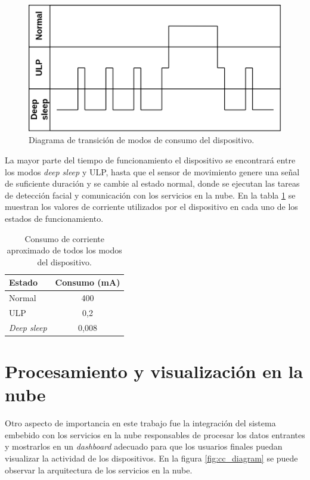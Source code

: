 \begin{figure}[h]
	\centering
	\includegraphics[scale=0.3]{./Figures/ulp_modes.png}
	\caption{Diagrama de transición de modos de consumo del dispositivo.}
	\label{fig:ulp_modes}
\end{figure}

La mayor parte del tiempo de funcionamiento el dispositivo se encontrará entre los modos \textit{deep sleep} y ULP, hasta que el sensor de movimiento genere una señal de suficiente duración y se cambie al estado normal, donde se ejecutan las tareas de detección facial y comunicación con los servicios en la nube. En la tabla \ref{tab:ulp_table} se muestran los valores de corriente utilizados por el dispositivo en cada uno de los estados de funcionamiento.

\begin{table}[h]
	\centering
	\caption[Consumo de corriente del dispositivo]{Consumo de corriente aproximado de todos los modos del dispositivo.}
	\begin{tabular}{lc}   
		\toprule
		\textbf{Estado} & \textbf{Consumo (mA)}  \\
		\midrule
		Normal & 400 \\
		ULP & 0,2 \\
		\textit{Deep sleep} & 0,008 \\
		\bottomrule
		\hline
	\end{tabular}
	\label{tab:ulp_table}
\end{table}

\section{Procesamiento y visualización en la nube}
Otro aspecto de importancia en este trabajo fue la integración del sistema embebido con los servicios en la nube responsables de procesar los datos entrantes y mostrarlos en un \textit{dashboard} adecuado para que los usuarios finales puedan visualizar la actividad de los dispositivos. En la figura \ref{fig:cc_diagram} se puede observar la arquitectura de los servicios en la nube.

